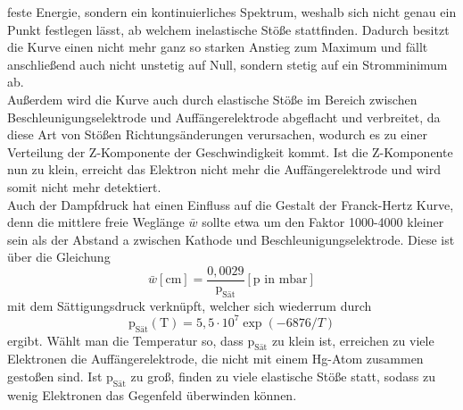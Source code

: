 feste Energie, sondern ein kontinuierliches Spektrum, weshalb sich nicht genau ein Punkt festlegen
lässt, ab welchem inelastische Stöße stattfinden. Dadurch besitzt die Kurve einen nicht mehr
ganz so starken Anstieg zum Maximum und fällt anschließend auch nicht unstetig auf Null, sondern
stetig auf ein Stromminimum ab. \\
Außerdem wird die Kurve auch durch elastische Stöße im Bereich zwischen
Beschleunigungselektrode und Auffängerelektrode abgeflacht und verbreitet, da diese
Art von Stößen Richtungsänderungen verursachen, wodurch es zu einer Verteilung der
Z-Komponente der Geschwindigkeit kommt. Ist die Z-Komponente nun zu klein, erreicht
das Elektron nicht mehr die Auffängerelektrode und wird somit nicht mehr detektiert.\\
Auch der Dampfdruck hat einen Einfluss auf die Gestalt der Franck-Hertz Kurve, denn die
mittlere freie Weglänge $\bar{w}$ sollte etwa um den Faktor 1000-4000 kleiner
sein als der Abstand a zwischen Kathode und Beschleunigungselektrode. Diese ist
über die Gleichung
\begin{equation}
  \bar{w} [\si{\centi\meter}]= \frac{0,0029}{\text{p}_{\text{Sät}}} [\text{p}\text{ in } \si{\milli\bar}]
  \label{eqn:wegl}
\end{equation}
mit dem Sättigungsdruck verknüpft, welcher sich wiederrum durch
\begin{equation}
  \text{p}_{\text{Sät}}(\text{T}) = 5,5 \cdot 10^{7} \exp{(-6876/T)}
  \label{eqn:psat}
\end{equation}
ergibt.
Wählt man die Temperatur so, dass $\text{p}_{\text{Sät}}$ zu klein ist, erreichen
zu viele Elektronen die Auffängerelektrode, die nicht mit einem
Hg-Atom zusammen gestoßen sind. Ist $\text{p}_{\text{Sät}}$ zu groß, finden zu viele
elastische Stöße statt, sodass zu wenig Elektronen das Gegenfeld überwinden können.
\newpage

